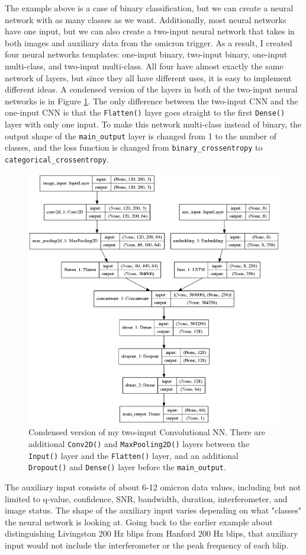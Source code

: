 \documentclass[a4paper]{article}
\begin{document}
The example above is a case of binary classification, but we can create a neural network with as many classes as we want. Additionally, most neural networks have one input, but we can also create a two-input neural network that takes in both images and auxiliary data from the omicron trigger. As a result, I created four neural networks templates: one-input binary, two-input binary, one-input multi-class, and two-input multi-class. All four have almost exactly the same network of layers, but since they all have different uses, it is easy to implement different ideas. A condensed version of the layers in both of the two-input neural networks is in Figure \ref{fig:sup_condensed}. The only difference between the two-input CNN and the one-input CNN is that the \texttt{Flatten()} layer goes straight to the first \texttt{Dense()} layer with only one input. To make this network multi-class instead of binary, the output shape of the \texttt{main\_output} layer is changed from 1 to the number of classes, and the loss function is changed from \texttt{binary\_crossentropy} to \texttt{categorical\_crossentropy}.

\begin{figure}[h!]
	\centering
	\includegraphics[width=.5\linewidth]{sup_condensed}
	\caption{Condensed version of my two-input Convolutional NN. There are additional \texttt{Conv2D()} and \texttt{MaxPooling2D()} layers between the \texttt{Input()} layer and the \texttt{Flatten()} layer, and an additional \texttt{Dropout()} and \texttt{Dense()} layer before the \texttt{main\_output}.}
	\label{fig:sup_condensed}
\end{figure}

The auxiliary input consists of about 6-12 omicron data values, including but not limited to q-value, confidence, SNR, bandwidth, duration, interferometer, and image status. The shape of the auxiliary input varies depending on what "classes" the neural network is looking at. Going back to the earlier example about distinguishing Livingston 200 Hz blips from Hanford 200 Hz blips, that auxiliary input would not include the interferometer or the peak frequency of each blip. 
\end{document}
